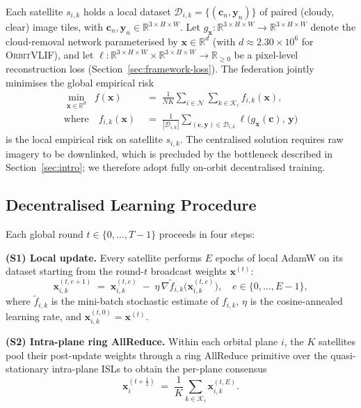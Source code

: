 \documentclass[conference]{IEEEtran}
\newcommand{\R}{\mathbb{R}}
\newcommand{\D}{\mathcal{D}}
\newcommand{\OrbitVLIF}{\textsc{OrbitVLIF}}
\begin{document}
Each satellite $s_{i,k}$ holds a local dataset
$\D_{i,k} = \{(\mathbf{c}_n, \mathbf{y}_n)\}$ of paired
\mbox{(cloudy,\,clear)} image tiles, with $\mathbf{c}_n,
\mathbf{y}_n \in \R^{3 \times H \times W}$. Let $g_{\mathbf{x}}\colon
\R^{3\times H\times W}\!\to\!\R^{3\times H\times W}$ denote the
cloud-removal network parameterised by $\mathbf{x} \in \R^d$ (with
$d \!\approx\! 2.30\!\times\!10^6$ for \OrbitVLIF), and let
$\ell\!:\R^{3\times H\times W}\!\times\!\R^{3\times H\times
W}\!\to\!\R_{\geq 0}$ be a pixel-level reconstruction loss
(Section~\ref{sec:framework-loss}). The federation jointly minimises
the global empirical risk
\begin{align}
\min_{\mathbf{x}\in\R^d}\;\;
f(\mathbf{x}) \;&=\; \frac{1}{NK}\!\sum_{i\in\mathcal{N}}
                       \sum_{k\in\mathcal{K}_i}\!
                       f_{i,k}(\mathbf{x}), \label{eq:global-obj}\\
\text{where}\quad
f_{i,k}(\mathbf{x}) \;&=\; \frac{1}{|\D_{i,k}|}
                          \!\sum_{(\mathbf{c},\mathbf{y})\in\D_{i,k}}
                          \!\ell\!\big(g_{\mathbf{x}}(\mathbf{c}),\,\mathbf{y}\big)
\label{eq:local-loss}
\end{align}
is the local empirical risk on satellite $s_{i,k}$. The centralised
solution requires raw imagery to be downlinked, which is precluded
by the bottleneck described in Section~\ref{sec:intro}; we therefore
adopt fully on-orbit decentralised training.

\subsection{Decentralised Learning Procedure}\label{sec:sysmodel-procedure}

Each global round $t \in \{0,\ldots,T\!-\!1\}$ proceeds in four
steps:

\textbf{(S1) Local update.} Every satellite performs $E$ epochs of
local AdamW on its dataset starting from the round-$t$ broadcast
weights $\mathbf{x}^{(t)}$:
\begin{equation}
\mathbf{x}_{i,k}^{(t,e+1)} \;=\;
\mathbf{x}_{i,k}^{(t,e)} \;-\;
\eta\,\nabla\widetilde f_{i,k}\!\big(\mathbf{x}_{i,k}^{(t,e)}\big),
\quad e\in\{0,\ldots,E\!-\!1\}, \label{eq:local-sgd}
\end{equation}
where $\widetilde f_{i,k}$ is the mini-batch stochastic estimate of
$f_{i,k}$, $\eta$ is the cosine-annealed learning rate, and
$\mathbf{x}_{i,k}^{(t,0)} \!=\! \mathbf{x}^{(t)}$.

\textbf{(S2) Intra-plane ring AllReduce.} Within each orbital plane
$i$, the $K$ satellites pool their post-update weights through a
ring AllReduce primitive over the quasi-stationary intra-plane
ISLs to obtain the per-plane consensus
\begin{equation}
\mathbf{x}_i^{(t+\tfrac12)} \;=\;
\frac{1}{K}\sum_{k\in\mathcal{K}_i}\!\mathbf{x}_{i,k}^{(t,E)}.
\label{eq:intra-plane-avg}
\end{equation}
\end{document}

